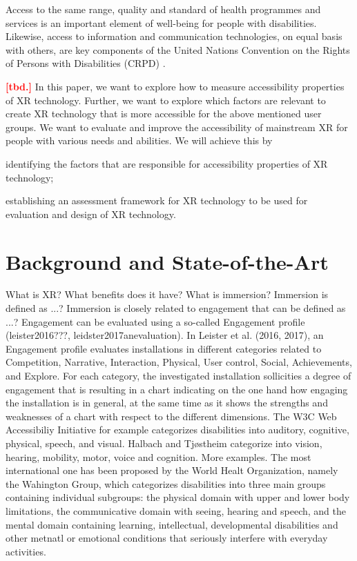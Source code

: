 \documentclass[11pt,english]{nik}
\newcommand{\WVL}[1]{\textbf{\textcolor{red}{#1}}}
\begin{document}
Access to the same range, quality and standard of health programmes and services is an important element of well-being
for people with disabilities. Likewise, access to information and communication technologies, on equal basis with
others, are key components of the United Nations Convention on the Rights of Persons with Disabilities
(CRPD) \autocite{UNDisabilities}.

\WVL{[tbd.]} In this paper, we want to explore how to measure accessibility properties of XR technology. 
Further, we want to explore which factors are relevant to create XR technology that is more accessible 
for the above mentioned user groups. 
%
We want to evaluate and improve the accessibility of mainstream XR for people with various needs
and abilities. We will achieve this by 
\begin{enumerate*}[label={\alph*)},ref=\alph*]
\item
identifying the factors that are responsible for accessibility properties of XR technology;
\item
establishing an assessment framework for XR technology to be used for evaluation and design of XR technology.%
\end{enumerate*}

\section{Background and State-of-the-Art}

What is XR? 
What benefits does it have? 
What is immersion?
Immersion is defined as ...?
Immersion is closely related to engagement  that can be defined as ...?
Engagement can be evaluated using a so-called Engagement profile (leister2016???, leidster2017anevaluation). In Leister et al. (2016, 2017), an Engagement profile evaluates installations in different categories related to Competition, Narrative, Interaction, Physical, User control, Social, Achievements, and Explore. For each category, the investigated installation sollicities a degree of engagement that is resulting in a chart indicating on the one hand how engaging the installation is in general, at the same time as it shows the strengths and weaknesses of a chart with respect to the different dimensions. The W3C Web Accessibiliy Initiative for example categorizes disabilities into auditory, cognitive, physical, speech, and visual. Halbach and Tjøstheim categorize into vision, hearing, mobility, motor, voice and cognition. More examples. The most international one has been proposed by the World Healt Organization, namely the Wahington Group, which categorizes disabilities into three main groups containing individual subgroups: the physical domain with upper and lower body limitations, the communicative domain with seeing, hearing and speech, and the mental domain containing learning, intellectual, developmental disabilities and other metnatl or emotional conditions that seriously interfere with everyday activities.
\end{document}
